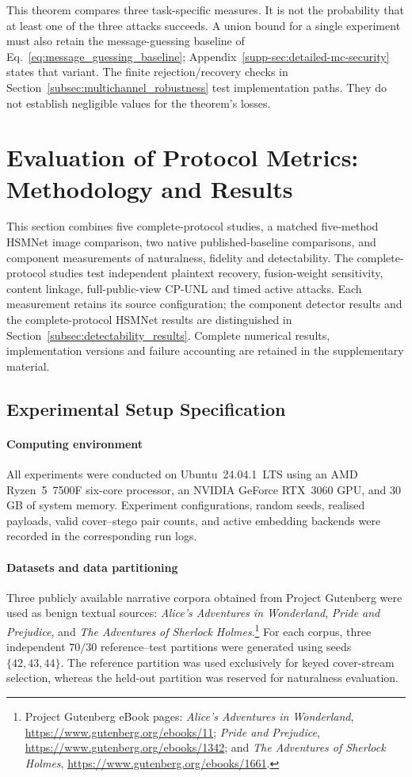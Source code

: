 \documentclass[pdflatex,sn-mathphys-num]{sn-jnl}%
\theoremstyle{definition}
\theoremstyle{game}
\theoremstyle{thmstyleone}%
\theoremstyle{thmstyletwo}%
\theoremstyle{thmstylethree}%
\begin{document}
This theorem compares three task-specific measures. It is not the
probability that at least one of the three attacks succeeds. A union bound
for a single experiment must also retain the message-guessing baseline of
Eq.~\eqref{eq:message_guessing_baseline}; Appendix~\ref{supp-sec:detailed-mc-security}
states that variant. The finite rejection/recovery checks in
Section~\ref{subsec:multichannel_robustness} test implementation paths. They do
not establish negligible values for the theorem's losses.


\section{Evaluation of Protocol Metrics: Methodology and Results}\label{sec:evaluation}

This section combines five complete-protocol studies, a matched
five-method HSMNet image comparison, two native published-baseline
comparisons, and component measurements of naturalness, fidelity and
detectability. The complete-protocol studies test independent plaintext recovery,
fusion-weight sensitivity, content linkage, full-public-view CP-UNL and
timed active attacks. Each measurement retains its source configuration;
the component detector results and the complete-protocol HSMNet results
are distinguished in Section~\ref{subsec:detectability_results}.
Complete numerical results, implementation versions and failure accounting
are retained in the supplementary material.
\subsection{Experimental Setup Specification}
\label{subsec:setup}

\paragraph{Computing environment}
All experiments were conducted on Ubuntu~24.04.1~LTS using an AMD Ryzen~5~7500F six-core processor, an NVIDIA GeForce RTX~3060 GPU, and 30\,GB of system memory. Experiment configurations, random seeds, realised payloads, valid cover--stego pair counts, and active embedding backends were recorded in the corresponding run logs.

\paragraph{Datasets and data partitioning}
Three publicly available narrative corpora obtained from Project
Gutenberg were used as benign textual sources:
\emph{Alice's Adventures in Wonderland},
\emph{Pride and Prejudice}, and
\emph{The Adventures of Sherlock Holmes}.\footnote{Project Gutenberg
eBook pages:
\emph{Alice's Adventures in Wonderland},
\url{https://www.gutenberg.org/ebooks/11};
\emph{Pride and Prejudice},
\url{https://www.gutenberg.org/ebooks/1342}; and
\emph{The Adventures of Sherlock Holmes},
\url{https://www.gutenberg.org/ebooks/1661}.}
For each corpus, three independent $70/30$ reference--test
partitions were generated using seeds
$\{42,43,44\}$. The reference partition was used exclusively for
keyed cover-stream selection, whereas the held-out partition was
reserved for naturalness evaluation.
\end{document}
